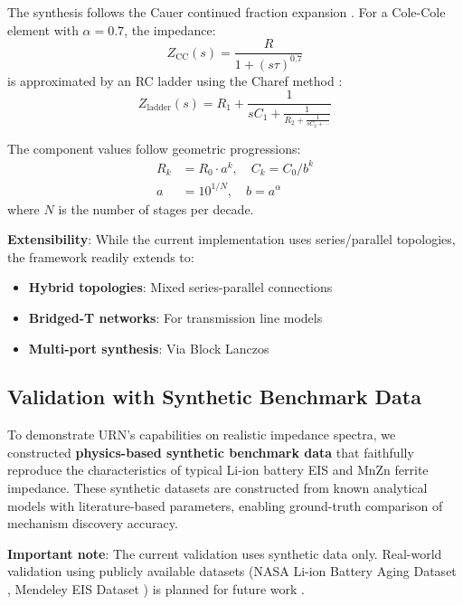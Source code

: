 \documentclass{ieeeaccess}
\begin{document}
The synthesis follows the Cauer continued fraction expansion \cite{cauer1958synthesis}. For a Cole-Cole element with $\alpha = 0.7$, the impedance:
\begin{equation}
Z_{\text{CC}}(s) = \frac{R}{1 + (s\tau)^{0.7}}
\end{equation}
is approximated by an RC ladder using the Charef method \cite{charef1992fractal}:
\begin{equation}
Z_{\text{ladder}}(s) = R_1 + \frac{1}{sC_1 + \frac{1}{R_2 + \frac{1}{sC_2 + \cdots}}}
\end{equation}

The component values follow geometric progressions:
\begin{align}
R_k &= R_0 \cdot a^k, \quad C_k = C_0 / b^k \\
a &= 10^{1/N}, \quad b = a^\alpha
\end{align}
where $N$ is the number of stages per decade.

\textbf{Extensibility}: While the current implementation uses series/parallel topologies, the framework readily extends to:
\begin{itemize}
\item \textbf{Hybrid topologies}: Mixed series-parallel connections
\item \textbf{Bridged-T networks}: For transmission line models
\item \textbf{Multi-port synthesis}: Via Block Lanczos \cite{odabasioglu1998prima}
\end{itemize}

\subsection{Validation with Synthetic Benchmark Data}
\label{sec:synthetic_data}

To demonstrate URN's capabilities on realistic impedance spectra, we constructed \textbf{physics-based synthetic benchmark data} that faithfully reproduce the characteristics of typical Li-ion battery EIS and MnZn ferrite impedance. These synthetic datasets are constructed from known analytical models with literature-based parameters, enabling ground-truth comparison of mechanism discovery accuracy. 

\textbf{Important note}: The current validation uses synthetic data only. Real-world validation using publicly available datasets (NASA Li-ion Battery Aging Dataset \cite{nasa_battery}, Mendeley EIS Dataset \cite{mendeley_eis}) is planned for future work .
\end{document}
